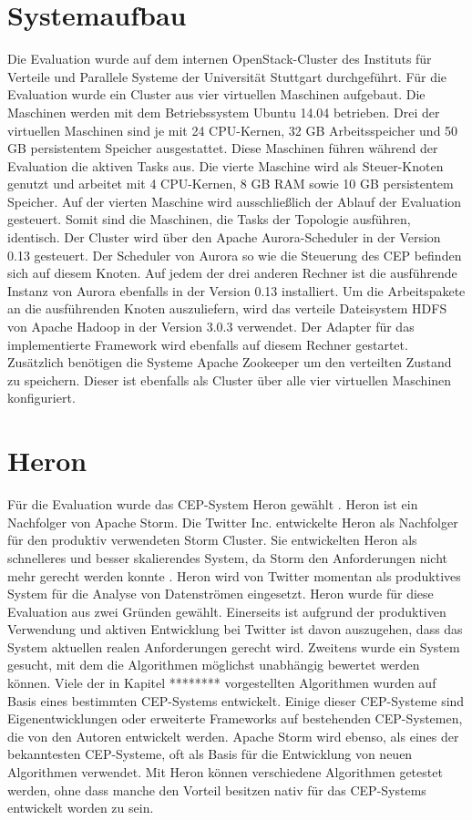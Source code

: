 \section{Systemaufbau}
Die Evaluation wurde auf dem internen OpenStack-Cluster des Instituts für Verteile und Parallele Systeme der Universität Stuttgart durchgeführt.
Für die Evaluation wurde ein Cluster aus vier virtuellen Maschinen aufgebaut.
Die Maschinen werden mit dem Betriebssystem Ubuntu 14.04 betrieben.
Drei der virtuellen Maschinen sind je mit 24 CPU-Kernen, 32 GB Arbeitsspeicher und 50 GB persistentem Speicher ausgestattet.
Diese Maschinen führen während der Evaluation die aktiven Tasks aus.
Die vierte Maschine wird als Steuer-Knoten genutzt und arbeitet mit 4 CPU-Kernen, 8 GB RAM sowie 10 GB persistentem Speicher.
Auf der vierten Maschine wird ausschließlich der Ablauf der Evaluation gesteuert.
Somit sind die Maschinen, die Tasks der Topologie ausführen, identisch.
Der Cluster wird über den Apache Aurora-Scheduler in der Version 0.13 gesteuert.
Der Scheduler von Aurora so wie die Steuerung des CEP befinden sich auf diesem Knoten.
Auf jedem der drei anderen Rechner ist die ausführende Instanz von Aurora ebenfalls in der Version 0.13 installiert.
Um die Arbeitspakete an die ausführenden Knoten auszuliefern, wird das verteile Dateisystem HDFS von Apache Hadoop in der Version 3.0.3 verwendet.
Der Adapter für das implementierte Framework wird ebenfalls auf diesem Rechner gestartet.
Zusätzlich benötigen die Systeme Apache Zookeeper um den verteilten Zustand zu speichern.
Dieser ist ebenfalls als Cluster über alle vier virtuellen Maschinen konfiguriert.

\section{Heron}
Für die Evaluation wurde das CEP-System Heron gewählt \cite{kulkarni_twitter_2015}.
Heron ist ein Nachfolger von Apache Storm.
Die Twitter Inc. entwickelte Heron als Nachfolger für den produktiv verwendeten Storm Cluster.
Sie entwickelten Heron als schnelleres und besser skalierendes System, da Storm den Anforderungen nicht mehr gerecht werden konnte \cite{kulkarni_twitter_2015}.
Heron wird von Twitter momentan als produktives System für die Analyse von Datenströmen eingesetzt.
Heron wurde für diese Evaluation aus zwei Gründen gewählt.
Einerseits ist aufgrund der produktiven Verwendung und aktiven Entwicklung bei Twitter ist davon auszugehen, dass das System aktuellen realen Anforderungen gerecht wird.
Zweitens wurde ein System gesucht, mit dem die Algorithmen möglichst unabhängig bewertet werden können.
Viele der in Kapitel ******** vorgestellten Algorithmen wurden auf Basis eines bestimmten CEP-Systems entwickelt.
Einige dieser CEP-Systeme sind Eigenentwicklungen oder erweiterte Frameworks auf bestehenden CEP-Systemen, die von den Autoren entwickelt werden.
Apache Storm wird ebenso, als eines der bekanntesten CEP-Systeme, oft als Basis für die Entwicklung von neuen Algorithmen verwendet.
Mit Heron können verschiedene Algorithmen getestet werden, ohne dass manche den Vorteil besitzen nativ für das CEP-Systems entwickelt worden zu sein.

